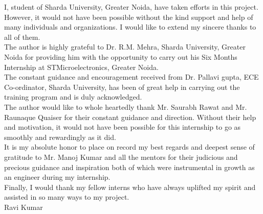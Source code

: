 \begin{Large}
\end{Large}
\noindent I, student of Sharda University, Greater Noida, have taken efforts in this project. However, it would not have been possible without the kind support and help of many individuals and organizations. I would like to extend my sincere thanks to all of them.\\

\noindent The author is highly grateful to Dr. R.M. Mehra, Sharda University, Greater Noida for providing him with the opportunity to carry out his Six Months Internship at STMicroelectronics, Greater Noida.\\

\noindent The constant guidance and encouragement received from Dr. Pallavi gupta, ECE Co-ordinator, Sharda University, has been of great help in carrying out the training program and is duly acknowledged.\\

\noindent The author would like to whole heartedly thank Mr. Saurabh Rawat and Mr. Raunaque Quaiser for their constant guidance and direction. Without their help and motivation, it would not have been possible for this internship to go as smoothly and rewardingly as it did.\\

\noindent It is my absolute honor to place on record my best regards and deepest sense of gratitude to Mr. Manoj Kumar and all the mentors for their judicious and precious guidance and inspiration both of which were instrumental in growth as an engineer during my internship.\\

\noindent Finally, I would thank my fellow interns who have always uplifted my spirit and assisted in so many ways to my project.\\

\noindent Ravi Kumar 

